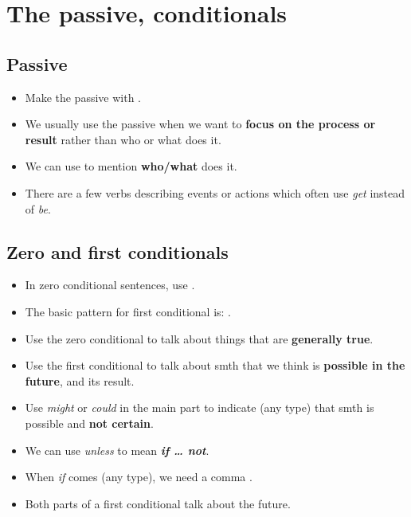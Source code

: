 \section{The passive, conditionals}

\subsection{Passive}
\begin{itemize}
    \item Make the passive with .
    \item We usually use the passive when we want to \textbf{focus on the process or result}
    rather than who or what does it.
    \item[\doot] We can use  to mention \textbf{who/what} does it.
    \item[\aast] There are a few verbs describing events or actions which often use \textit{get} instead of \textit{be}.
\end{itemize}

\subsection{Zero and first conditionals}
\begin{itemize}
    \item In zero conditional sentences, use .
    \item The basic pattern for first conditional is:
    .
    \item Use the zero conditional to talk about things that are \textbf{generally true}.
    \item Use the first conditional to talk about smth that we think is \textbf{possible in the future},
    and its result.
    \item Use \textit{might} or \textit{could} in the main part to indicate (any type)
    that smth is possible and \textbf{not certain}.
    \item We can use \textit{unless} to mean \textbf{\textit{if \ldots{} not}}.
    \item When \textit{if} comes  (any type), we need a comma .
    \item[\ast] Both parts of a first conditional talk about the future.
\end{itemize}

